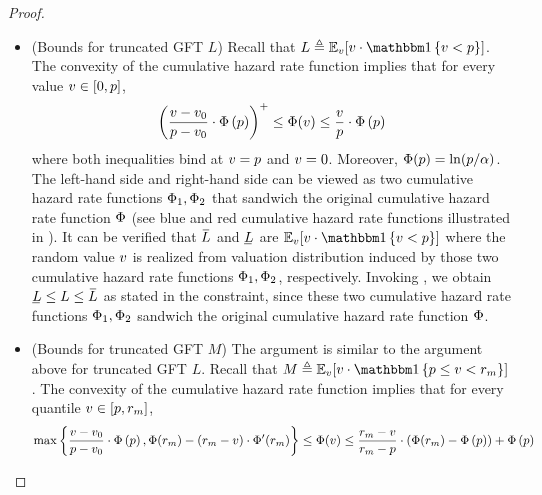 \begin{proof}
\begin{itemize}
        \item (Bounds for truncated GFT $L$) Recall that $L \triangleq \expect[\val]{\val\cdot \indicator{\val < \price}}$. The convexity of the cumulative hazard rate function implies that for every value $v \in [0, p]$,
        \begin{align*}
            \left( 
            \frac{v - v_0}{p - v_0}
            \cdot \Phi\left(p\right)
             \right)^+
            \leq 
            \Phi(v) 
            \leq
            \frac{v}{p}\cdot \Phi\left(p\right)
        \end{align*}
        where both inequalities bind at $v = p$ and $v = 0$. Moreover, $\Phi(p) = \ln(p/\alpha)$. The left-hand side and right-hand side can be viewed as two cumulative hazard rate functions $\Phi_1, \Phi_2$ that sandwich the original cumulative hazard rate function $\Phi$ (see blue and red cumulative hazard rate functions illustrated in ). It can be verified that $\LOverBar$ and $\LUnderBar$ are $\expect[\val]{\val\cdot \indicator{ \val < \price}}$ where the random value $v$ is realized from valuation distribution induced by those two cumulative hazard rate functions $\Phi_1, \Phi_2$, respectively. Invoking , we obtain $\LUnderBar\leq L \leq \LOverBar$ as stated in the constraint, since these two cumulative hazard rate functions $\Phi_1, \Phi_2$ sandwich the original cumulative hazard rate function $\Phi$.
        \item (Bounds for truncated GFT $M$) The argument is similar to the argument above for truncated GFT $L$. Recall that $M \triangleq \expect[\val]{\val\cdot \indicator{ \price \leq \val <\optreserve }}$. The convexity of the cumulative hazard rate function implies that for every quantile $v \in [p, r_m]$,
        \begin{align*}
            \max\left\{
            \frac{v - v_0}{p - v_0}
            \cdot 
            \Phi\left(p\right)
            ,
            \Phi(r_m) - (r_m - v)\cdot \Phi'(r_m) 
            \right\}
            \leq 
            \Phi(v) 
            \leq
            \frac{r_m - v}{r_m - p}
            \cdot \left(\Phi(r_m) - \Phi\left(p\right)\right)
            +
            \Phi\left(p\right)
        \end{align*}

\end{itemize}
\end{proof}
